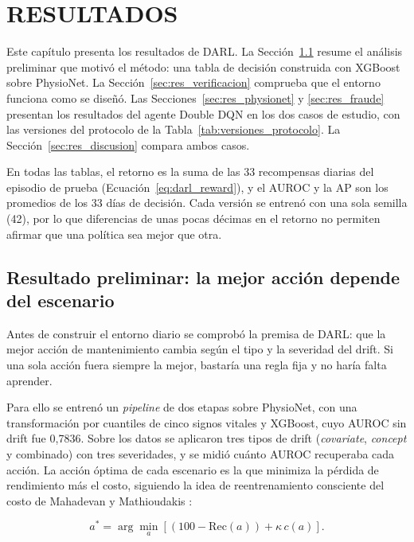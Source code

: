 \chapter{RESULTADOS}
\label{chap:resultados}

Este capítulo presenta los resultados de DARL. La Sección~\ref{sec:res_preliminar} resume el
análisis preliminar que motivó el método: una tabla de decisión construida con XGBoost sobre
PhysioNet. La Sección~\ref{sec:res_verificacion} comprueba que el entorno funciona como se
diseñó. Las Secciones~\ref{sec:res_physionet} y \ref{sec:res_fraude} presentan los resultados
del agente Double DQN en los dos casos de estudio, con las versiones del protocolo de la
Tabla~\ref{tab:versiones_protocolo}. La Sección~\ref{sec:res_discusion} compara ambos casos.

En todas las tablas, el retorno es la suma de las 33 recompensas diarias del episodio de prueba
(Ecuación~\ref{eq:darl_reward}), y el AUROC y la AP son los promedios de los 33 días de
decisión. Cada versión se entrenó con una sola semilla (42), por lo que diferencias de unas
pocas décimas en el retorno no permiten afirmar que una política sea mejor que otra.

\section{Resultado preliminar: la mejor acción depende del escenario}
\label{sec:res_preliminar}

Antes de construir el entorno diario se comprobó la premisa de DARL: que la mejor acción de
mantenimiento cambia según el tipo y la severidad del drift. Si una sola acción fuera siempre la
mejor, bastaría una regla fija y no haría falta aprender.

Para ello se entrenó un \textit{pipeline} de dos etapas sobre PhysioNet, con una transformación
por cuantiles de cinco signos vitales y XGBoost, cuyo AUROC sin drift fue 0,7836. Sobre los
datos se aplicaron tres tipos de drift (\textit{covariate}, \textit{concept} y combinado) con
tres severidades, y se midió cuánto AUROC recuperaba cada acción. La acción óptima de cada
escenario es la que minimiza la pérdida de rendimiento más el costo, siguiendo la idea de
reentrenamiento consciente del costo de Mahadevan y Mathioudakis \cite{mahadevan2024cost}:

\begin{equation}
    a^{*} = \arg\min_{a} \left[ \left(100 - \text{Rec}(a)\right) + \kappa\, c(a) \right].
    \label{eq:res_optima}
\end{equation}

